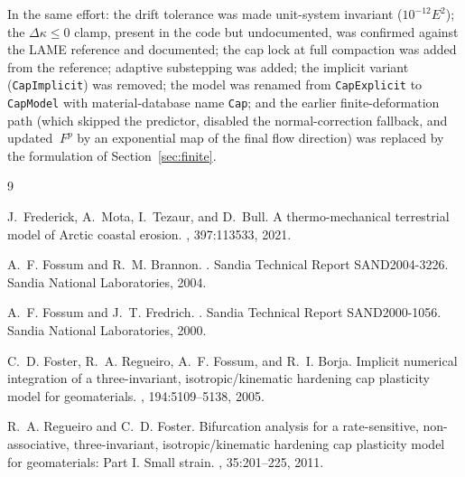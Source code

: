 \documentclass[12pt]{article}
\newcommand{\Fplas}{{~F^p}}
\begin{document}
In the same effort: the drift tolerance was made unit-system
invariant ($10^{-12} E^2$); the $\Delta\kappa \le 0$ clamp, present
in the code but undocumented, was confirmed against the LAME
reference and documented; the cap lock at full compaction was added
from the reference; adaptive substepping was added; the implicit
variant (\texttt{CapImplicit}) was removed; the model was renamed
from \texttt{CapExplicit} to \texttt{CapModel} with material-database
name \texttt{Cap}; and the earlier finite-deformation path (which
skipped the predictor, disabled the normal-correction fallback, and
updated $\Fplas$ by an exponential map of the final flow direction)
was replaced by the formulation of Section~\ref{sec:finite}.

\begin{thebibliography}{9}

J.~Frederick, A.~Mota, I.~Tezaur, and D.~Bull.
\newblock A thermo-mechanical terrestrial model of {Arctic} coastal erosion.
, 397:113533,
  2021.

A.~F. Fossum and R.~M. Brannon.
.
\newblock Sandia Technical Report SAND2004-3226. Sandia National Laboratories,
  2004.

A.~F. Fossum and J.~T. Fredrich.
.
\newblock Sandia Technical Report SAND2000-1056. Sandia National Laboratories,
  2000.

C.~D. Foster, R.~A. Regueiro, A.~F. Fossum, and R.~I. Borja.
\newblock Implicit numerical integration of a three-invariant,
  isotropic/kinematic hardening cap plasticity model for geomaterials.
,
  194:5109--5138, 2005.

R.~A. Regueiro and C.~D. Foster.
\newblock Bifurcation analysis for a rate-sensitive, non-associative,
  three-invariant, isotropic/kinematic hardening cap plasticity model for
  geomaterials: Part I. Small strain.
, 35:201--225, 2011.


\end{thebibliography}
\end{document}
